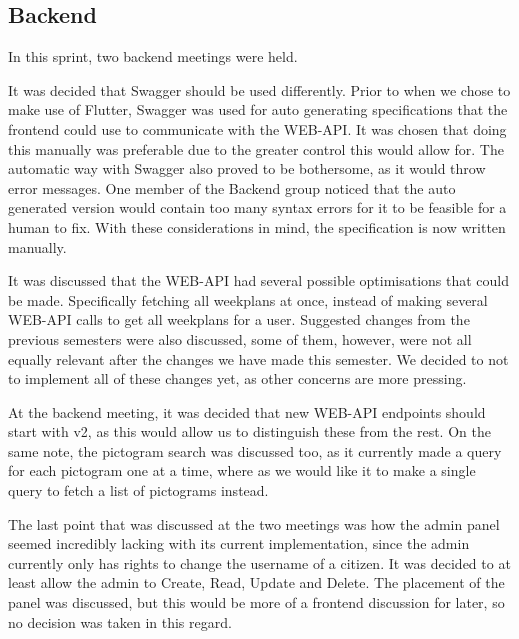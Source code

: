\subsection{Backend}
In this sprint, two backend meetings were held.

It was decided that Swagger should be used differently.
Prior to when we chose to make use of Flutter, Swagger was used for auto generating specifications that the frontend could use to communicate with the WEB-API.
It was chosen that doing this manually was preferable due to the greater control this would allow for.
The automatic way with Swagger also proved to be bothersome, as it would throw error messages.
One member of the Backend group noticed that the auto generated version would contain too many syntax errors for it to be feasible for a human to fix.
With these considerations in mind, the specification is now written manually.

It was discussed that the WEB-API had several possible optimisations that could be made.
Specifically fetching all weekplans at once, instead of making several WEB-API calls to get all weekplans for a user.
Suggested changes from the previous semesters were also discussed, some of them, however, were not all equally relevant after the changes we have made this semester.
We decided to not to implement all of these changes yet, as other concerns are more pressing.

At the backend meeting, it was decided that new WEB-API endpoints should start with v2, as this would allow us to distinguish these from the rest.
On the same note, the pictogram search was discussed too, as it currently made a query for each pictogram one at a time, where as we would like it to make a single query to fetch a list of pictograms instead.

The last point that was discussed at the two meetings was how the admin panel seemed incredibly lacking with its current implementation, since the admin currently only has rights to change the username of a citizen. 
It was decided to at least allow the admin to Create, Read, Update and Delete. 
The placement of the panel was discussed, but this would be more of a frontend discussion for later, so no decision was taken in this regard.
